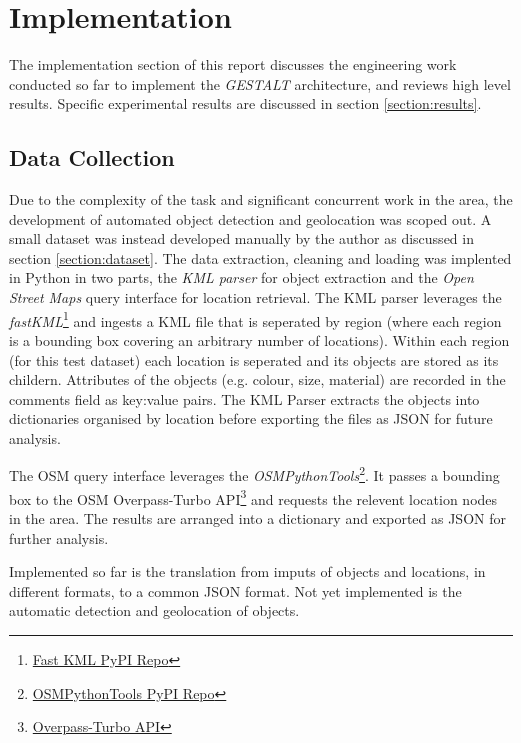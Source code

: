 \section{Implementation}
\label{section:implementation}

The implementation section of this report discusses the engineering work conducted so far to implement the \textit{GESTALT} architecture, and reviews high level results. Specific experimental results are discussed in section \ref{section:results}.

\subsection{Data Collection}
Due to the complexity of the task and significant concurrent work in the area, the development of automated object detection and geolocation was scoped out. 
A small dataset was instead developed manually by the author as discussed in section \ref{section:dataset}. 
The data extraction, cleaning and loading was implented in Python in two parts, the \textit{KML parser} for object extraction and the \textit{Open Street Maps} query interface for location retrieval. 
The KML parser leverages the \textit{fastKML}\footnote{\href{https://pypi.org/project/fastkml/}{Fast KML PyPI Repo}} and ingests a KML file that is seperated by region (where each region is a bounding box covering an arbitrary number of locations). 
Within each region (for this test dataset) each location is seperated and its objects are stored as its childern. 
Attributes of the objects (e.g. colour, size, material) are recorded in the comments field as key:value pairs.
The KML Parser extracts the objects into dictionaries organised by location before exporting the files as JSON for future analysis. 

The OSM query interface leverages the \textit{OSMPythonTools}\footnote{\href{https://pypi.org/project/OSMPythonTools/}{OSMPythonTools PyPI Repo}}. It passes a bounding box to the OSM Overpass-Turbo API\footnote{\href{https://overpass-turbo.eu/}{Overpass-Turbo API}} and requests the relevent location nodes in the area. 
The results are arranged into a dictionary and exported as JSON for further analysis. 

Implemented so far is the translation from imputs of objects and locations, in different formats, to a common JSON format. Not yet implemented is the automatic detection and geolocation of objects. 

